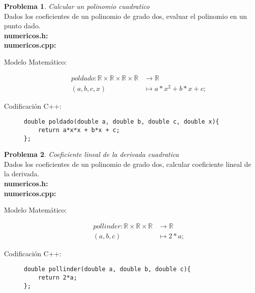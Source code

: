 \documentclass{article}
\theoremstyle{plain}
\theoremstyle{definition}
\newtheorem{problem}{Problema}
\begin{document}
\begin{problem} \emph{Calcular un polinomio cuadratico}\\
Dados los coeficientes de un polinomio de grado dos, evaluar el polinomio en un punto dado.\\
\textbf{numericos.h:}\ \\
\textbf{numericos.cpp:}\ 
%
\begin{description}
\item[Modelo Matemático:]
%
\begin{align*}
pol dado: \mathbb{R}\times\mathbb{R}\times\mathbb{R}\times\mathbb{R} &\to \mathbb{R}\\
(a,b,c,x) &\mapsto a*x^2 + b*x + c;
\end{align*}
%
\item[Codificación \textsf{C++}:]\hfill
%
\begin{verbatim}
double poldado(double a, double b, double c, double x){
    return a*x*x + b*x + c;
};
\end{verbatim}
\end{description}
\end{problem}

\begin{problem} \emph{Coeficiente lineal de la derivada cuadratica}\\
Dados los coeficientes de un polinomio de grado dos, calcular coeficiente lineal de la derivada.\\
\textbf{numericos.h:}\ \\
\textbf{numericos.cpp:}\ 
%
\begin{description}
\item[Modelo Matemático:]
%
\begin{align*}
pol lin der: \mathbb{R}\times\mathbb{R}\times\mathbb{R} &\to \mathbb{R}\\
(a,b,c) &\mapsto 2*a;
\end{align*}
%
\item[Codificación \textsf{C++}:]\hfill
%
\begin{verbatim}
double pollinder(double a, double b, double c){
    return 2*a;
};
\end{verbatim}
\end{description}
\end{problem}
\end{document}
